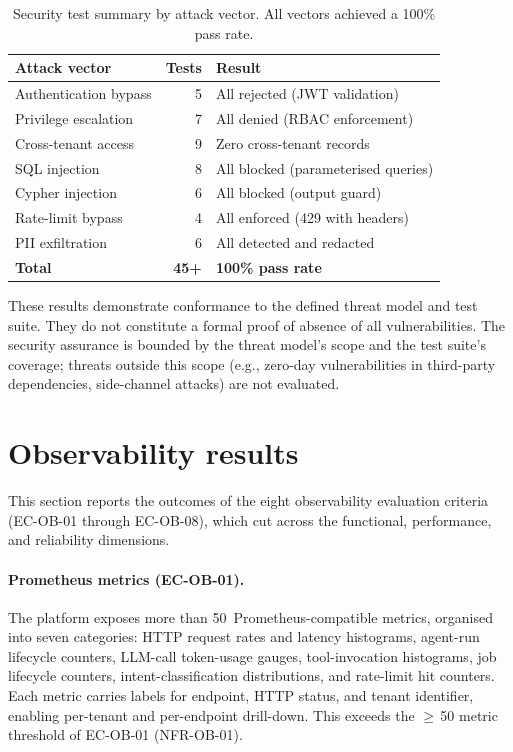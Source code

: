 \documentclass[a4paper,noexaminfo]{sapthesis}
\begin{document}
\begin{table}[ht]
\centering
\caption{Security test summary by attack vector.  All vectors achieved
a 100\% pass rate.}
\label{tab:security-summary}
\small
\begin{tabular}{lrl}
    \hline
    \textbf{Attack vector} & \textbf{Tests} & \textbf{Result} \\
    \hline
    Authentication bypass     & 5 & All rejected (JWT validation) \\
    Privilege escalation      & 7 & All denied (RBAC enforcement) \\
    Cross-tenant access       & 9 & Zero cross-tenant records \\
    SQL injection             & 8 & All blocked (parameterised queries) \\
    Cypher injection          & 6 & All blocked (output guard) \\
    Rate-limit bypass         & 4 & All enforced (429 with headers) \\
    PII exfiltration          & 6 & All detected and redacted \\
    \hline
    \textbf{Total}            & \textbf{45+} & \textbf{100\% pass rate} \\
    \hline
\end{tabular}
\end{table}

These results demonstrate conformance to the defined threat model and
test suite.  They do not constitute a formal proof of absence of all
vulnerabilities.  The security assurance is bounded by the threat model's
scope and the test suite's coverage; threats outside this scope (e.g.,
zero-day vulnerabilities in third-party dependencies, side-channel
attacks) are not evaluated.


\section{Observability results}
\label{sec:observability-results}

This section reports the outcomes of the eight observability evaluation
criteria (EC-OB-01 through EC-OB-08), which cut across the functional,
performance, and reliability dimensions.

\paragraph{Prometheus metrics (EC-OB-01).}
The platform exposes more than 50~Prometheus-compatible metrics, organised
into seven categories: HTTP request rates and latency histograms,
agent-run lifecycle counters, LLM-call token-usage gauges, tool-invocation
histograms, job lifecycle counters, intent-classification distributions,
and rate-limit hit counters.  Each metric carries labels for endpoint,
HTTP status, and tenant identifier, enabling per-tenant and per-endpoint
drill-down.  This exceeds the $\geq$\,50 metric threshold of EC-OB-01
(NFR-OB-01).
\end{document}
